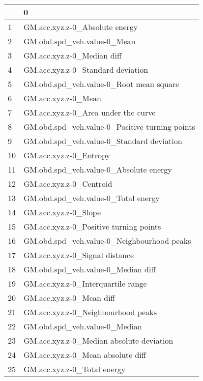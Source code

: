\begin{tabular}{ll}
\toprule
{} &                                                 0 \\
\midrule
1  &                    GM.acc.xyz.z-0\_Absolute energy \\
2  &                       GM.obd.spd\_veh.value-0\_Mean \\
3  &                        GM.acc.xyz.z-0\_Median diff \\
4  &                 GM.acc.xyz.z-0\_Standard deviation \\
5  &           GM.obd.spd\_veh.value-0\_Root mean square \\
6  &                               GM.acc.xyz.z-0\_Mean \\
7  &               GM.acc.xyz.z-0\_Area under the curve \\
8  &    GM.obd.spd\_veh.value-0\_Positive turning points \\
9  &         GM.obd.spd\_veh.value-0\_Standard deviation \\
10 &                            GM.acc.xyz.z-0\_Entropy \\
11 &            GM.obd.spd\_veh.value-0\_Absolute energy \\
12 &                           GM.acc.xyz.z-0\_Centroid \\
13 &               GM.obd.spd\_veh.value-0\_Total energy \\
14 &                              GM.acc.xyz.z-0\_Slope \\
15 &            GM.acc.xyz.z-0\_Positive turning points \\
16 &        GM.obd.spd\_veh.value-0\_Neighbourhood peaks \\
17 &                    GM.acc.xyz.z-0\_Signal distance \\
18 &                GM.obd.spd\_veh.value-0\_Median diff \\
19 &                GM.acc.xyz.z-0\_Interquartile range \\
20 &                          GM.acc.xyz.z-0\_Mean diff \\
21 &                GM.acc.xyz.z-0\_Neighbourhood peaks \\
22 &                     GM.obd.spd\_veh.value-0\_Median \\
23 &          GM.acc.xyz.z-0\_Median absolute deviation \\
24 &                 GM.acc.xyz.z-0\_Mean absolute diff \\
25 &                       GM.acc.xyz.z-0\_Total energy \\

\end{tabular}
